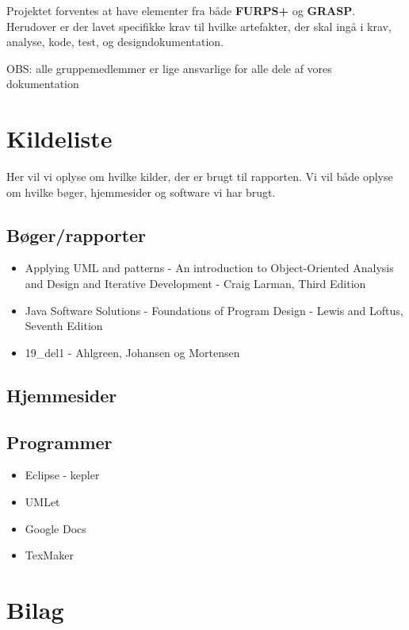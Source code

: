 \documentclass{article}
\begin{document}
Projektet forventes at have elementer fra både \textbf{FURPS+} og \textbf{GRASP}. Herudover er der lavet specifikke krav til hvilke artefakter, der skal ingå i krav, analyse, kode, test, og designdokumentation.



OBS: alle gruppemedlemmer er lige ansvarlige for alle dele af vores dokumentation










\section{Kildeliste}
Her vil vi oplyse om hvilke kilder, der er brugt til rapporten.
Vi vil både oplyse om hvilke bøger, hjemmesider og software vi har brugt.
\subsection{Bøger/rapporter}
\printbibliography %
\begin{itemize}
\item Applying UML and patterns - An introduction to Object-Oriented Analysis and Design and Iterative Development - Craig Larman, Third Edition
\item Java Software Solutions -  Foundations of Program Design - Lewis and Loftus, Seventh Edition
\item 19\_del1 - Ahlgreen, Johansen og Mortensen
\end{itemize}
\subsection{Hjemmesider}
\subsection{Programmer}
\begin{itemize}
\item Eclipse - kepler
\item UMLet
\item Google Docs
\item TexMaker
\end{itemize}
\newpage
\section{Bilag}
\end{document}
